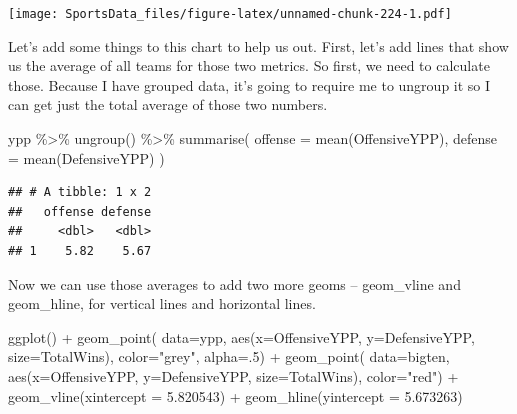 \documentclass[
]{book}
\newenvironment{Shaded}{\begin{snugshade}}{\end{snugshade}}
\newcommand{\AttributeTok}[1]{\textcolor[rgb]{0.77,0.63,0.00}{#1}}
\newcommand{\DecValTok}[1]{\textcolor[rgb]{0.00,0.00,0.81}{#1}}
\newcommand{\FloatTok}[1]{\textcolor[rgb]{0.00,0.00,0.81}{#1}}
\newcommand{\FunctionTok}[1]{\textcolor[rgb]{0.00,0.00,0.00}{#1}}
\newcommand{\NormalTok}[1]{#1}
\newcommand{\SpecialCharTok}[1]{\textcolor[rgb]{0.00,0.00,0.00}{#1}}
\newcommand{\StringTok}[1]{\textcolor[rgb]{0.31,0.60,0.02}{#1}}
\begin{document}
\texttt{[image: SportsData\_files/figure-latex/unnamed-chunk-224-1.pdf]}

Let's add some things to this chart to help us out. First, let's add lines that show us the average of all teams for those two metrics. So first, we need to calculate those. Because I have grouped data, it's going to require me to ungroup it so I can get just the total average of those two numbers.

\begin{Shaded}
\begin{Highlighting}[]
\NormalTok{ypp }\SpecialCharTok{\%\textgreater{}\%} 
  \FunctionTok{ungroup}\NormalTok{() }\SpecialCharTok{\%\textgreater{}\%} 
  \FunctionTok{summarise}\NormalTok{(}
    \AttributeTok{offense =} \FunctionTok{mean}\NormalTok{(OffensiveYPP), }
    \AttributeTok{defense =} \FunctionTok{mean}\NormalTok{(DefensiveYPP)}
\NormalTok{    )}
\end{Highlighting}
\end{Shaded}

\begin{verbatim}
## # A tibble: 1 x 2
##   offense defense
##     <dbl>   <dbl>
## 1    5.82    5.67
\end{verbatim}

Now we can use those averages to add two more geoms -- geom\_vline and geom\_hline, for vertical lines and horizontal lines.

\begin{Shaded}
\begin{Highlighting}[]
\FunctionTok{ggplot}\NormalTok{() }\SpecialCharTok{+} 
  \FunctionTok{geom\_point}\NormalTok{(}
    \AttributeTok{data=}\NormalTok{ypp, }
    \FunctionTok{aes}\NormalTok{(}\AttributeTok{x=}\NormalTok{OffensiveYPP, }\AttributeTok{y=}\NormalTok{DefensiveYPP, }\AttributeTok{size=}\NormalTok{TotalWins), }
    \AttributeTok{color=}\StringTok{"grey"}\NormalTok{, }
    \AttributeTok{alpha=}\NormalTok{.}\DecValTok{5}\NormalTok{) }\SpecialCharTok{+} 
  \FunctionTok{geom\_point}\NormalTok{(}
    \AttributeTok{data=}\NormalTok{bigten, }
    \FunctionTok{aes}\NormalTok{(}\AttributeTok{x=}\NormalTok{OffensiveYPP, }\AttributeTok{y=}\NormalTok{DefensiveYPP, }\AttributeTok{size=}\NormalTok{TotalWins), }
    \AttributeTok{color=}\StringTok{"red"}\NormalTok{) }\SpecialCharTok{+} 
  \FunctionTok{geom\_vline}\NormalTok{(}\AttributeTok{xintercept =} \FloatTok{5.820543}\NormalTok{) }\SpecialCharTok{+} 
  \FunctionTok{geom\_hline}\NormalTok{(}\AttributeTok{yintercept =} \FloatTok{5.673263}\NormalTok{)}
\end{Highlighting}
\end{Shaded}
\end{document}
